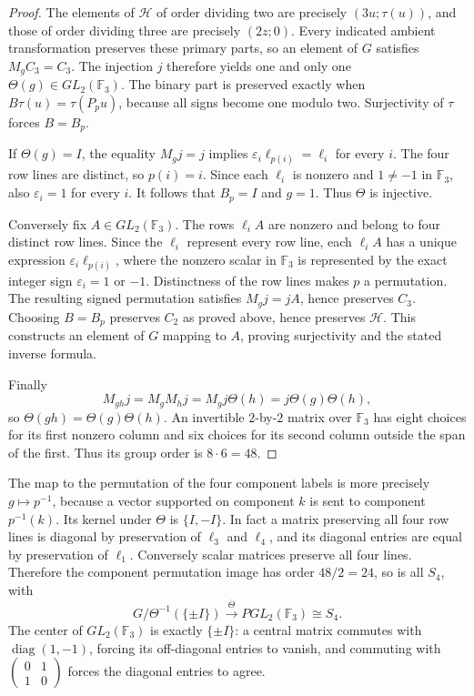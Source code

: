\begin{proof}
The elements of \(\mathcal H\) of order dividing two are precisely
\((3u;\tau(u))\), and those of order dividing three are precisely
\((2z;0)\).  Every indicated ambient transformation preserves these primary
parts, so an element of \(G\) satisfies \(M_gC_3=C_3\).  The injection
\(j\) therefore yields one and only one \(\Theta(g)\in GL_2(\mathbb F_3)\).
The binary part is preserved exactly when
\(B\tau(u)=\tau(P_pu)\), because all signs become one modulo two.
Surjectivity of \(\tau\) forces \(B=B_p\).

If \(\Theta(g)=I\), the equality \(M_gj=j\) implies
\(\varepsilon_i\ell_{p(i)}=\ell_i\) for every \(i\).
The four row lines are distinct, so \(p(i)=i\).  Since each \(\ell_i\)
is nonzero and \(1\ne-1\) in \(\mathbb F_3\), also
\(\varepsilon_i=1\) for every \(i\).  It follows that \(B_p=I\) and
\(g=1\).  Thus \(\Theta\) is injective.

Conversely fix \(A\in GL_2(\mathbb F_3)\).  The rows \(\ell_iA\) are
nonzero and belong to four distinct row lines.  Since the \(\ell_i\)
represent every row line, each \(\ell_iA\) has a unique expression
\(\varepsilon_i\ell_{p(i)}\), where the nonzero scalar in \(\mathbb F_3\)
is represented by the exact integer sign \(\varepsilon_i=1\) or \(-1\).
Distinctness of the row lines makes \(p\) a permutation.
The resulting signed permutation satisfies \(M_gj=jA\), hence preserves
\(C_3\).  Choosing \(B=B_p\) preserves \(C_2\) as proved above, hence
preserves \(\mathcal H\).  This constructs an element of \(G\) mapping
to \(A\), proving surjectivity and the stated inverse formula.

Finally
\[
 M_{gh}j=M_gM_hj=M_gj\Theta(h)
 =j\Theta(g)\Theta(h),
\]
so \(\Theta(gh)=\Theta(g)\Theta(h)\).
An invertible \(2\)-by-\(2\) matrix over \(\mathbb F_3\) has eight
choices for its first nonzero column and six choices for its second column
outside the span of the first.  Thus its group order is \(8\cdot6=48\).
\end{proof}

The map to the permutation of the four component labels is more precisely
\(g\mapsto p^{-1}\), because a vector supported on component \(k\) is
sent to component \(p^{-1}(k)\).  Its kernel under \(\Theta\) is
\(\{I,-I\}\).  In fact a matrix preserving all four row lines is diagonal
by preservation of \(\ell_3\) and \(\ell_4\), and its diagonal entries
are equal by preservation of \(\ell_1\).  Conversely scalar matrices
preserve all four lines.  Therefore the component permutation image has
order \(48/2=24\), so is all \(S_4\), with
\[
 G/\Theta^{-1}(\{\pm I\})
       \xrightarrow{\ \overline\Theta\ }PGL_2(\mathbb F_3)\cong S_4.
\]
The center of \(GL_2(\mathbb F_3)\) is exactly \(\{\pm I\}\): a
central matrix commutes with \(\operatorname{diag}(1,-1)\), forcing its
off-diagonal entries to vanish, and commuting with
\(\left(\begin{smallmatrix}0&1\\1&0\end{smallmatrix}\right)\) forces
the diagonal entries to agree.

